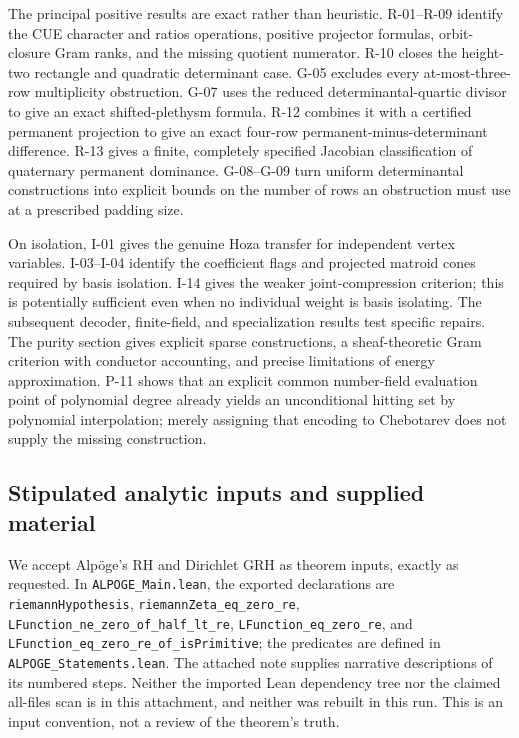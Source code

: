 \documentclass[11pt,a4paper]{article}
\theoremstyle{definition}\newtheorem{definition}{Definition}
\begin{document}
The principal positive results are exact rather than heuristic. R-01--R-09 identify the CUE character and ratios operations, positive projector formulas, orbit-closure Gram ranks, and the missing quotient numerator. R-10 closes the height-two rectangle and quadratic determinant case. G-05 excludes every at-most-three-row multiplicity obstruction. G-07 uses the reduced determinantal-quartic divisor to give an exact shifted-plethysm formula. R-12 combines it with a certified permanent projection to give an exact four-row permanent-minus-determinant difference. R-13 gives a finite, completely specified Jacobian classification of quaternary permanent dominance. G-08--G-09 turn uniform determinantal constructions into explicit bounds on the number of rows an obstruction must use at a prescribed padding size.

On isolation, I-01 gives the genuine Hoza transfer for independent vertex variables. I-03--I-04 identify the coefficient flags and projected matroid cones required by basis isolation. I-14 gives the weaker joint-compression criterion; this is potentially sufficient even when no individual weight is basis isolating. The subsequent decoder, finite-field, and specialization results test specific repairs. The purity section gives explicit sparse constructions, a sheaf-theoretic Gram criterion with conductor accounting, and precise limitations of energy approximation. P-11 shows that an explicit common number-field evaluation point of polynomial degree already yields an unconditional hitting set by polynomial interpolation; merely assigning that encoding to Chebotarev does not supply the missing construction.

\subsection{Stipulated analytic inputs and supplied material}

We accept Alp\"oge's RH and Dirichlet GRH as theorem inputs, exactly as requested. In \texttt{ALPOGE\_Main.lean}, the exported declarations are \texttt{riemannHypothesis}, \texttt{riemannZeta\_eq\_zero\_re}, \texttt{LFunction\_ne\_zero\_of\_half\_lt\_re}, \texttt{LFunction\_eq\_zero\_re}, and \texttt{LFunction\_eq\_zero\_re\_of\_isPrimitive}; the predicates are defined in \texttt{ALPOGE\_Statements.lean}. The attached note supplies narrative descriptions of its numbered steps. Neither the imported Lean dependency tree nor the claimed all-files scan is in this attachment, and neither was rebuilt in this run. This is an input convention, not a review of the theorem's truth.
\end{document}
